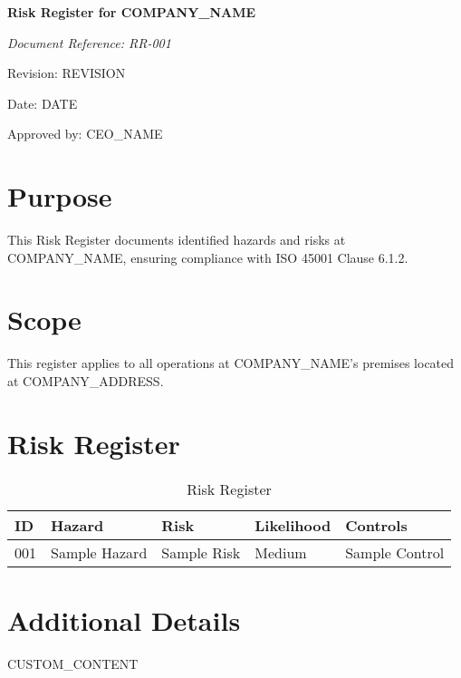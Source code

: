 \documentclass[12pt]{article}
\begin{document}
\begin{titlepage}
    \centering
    \vspace*{2cm}
    {\LARGE\bfseries Risk Register for {{COMPANY_NAME}}\par}
    \vspace{1cm}
    {\large\itshape Document Reference: RR-001\par}
    \vspace{0.5cm}
    {\normalsize Revision: {{REVISION}}\par}
    \vspace{0.5cm}
    {\normalsize Date: {{DATE}}\par}
    \vspace{2cm}
    {\normalsize Approved by: {{CEO_NAME}}\par}
\end{titlepage}

\section{Purpose}
This Risk Register documents identified hazards and risks at {{COMPANY_NAME}}, ensuring compliance with ISO 45001 Clause 6.1.2.

\section{Scope}
This register applies to all operations at {{COMPANY_NAME}}'s premises located at {{COMPANY_ADDRESS}}.

\section{Risk Register}
\begin{table}[h]
    \centering
    \begin{tabular}{p{2cm}p{3cm}p{3cm}p{3cm}p{3cm}}
        \toprule
        \textbf{ID} & \textbf{Hazard} & \textbf{Risk} & \textbf{Likelihood} & \textbf{Controls} \\
        \midrule
        001 & Sample Hazard & Sample Risk & Medium & Sample Control \\
        \bottomrule
    \end{tabular}
    \caption{Risk Register}
\end{table}

\section{Additional Details}
{{CUSTOM_CONTENT}}
\end{document}
